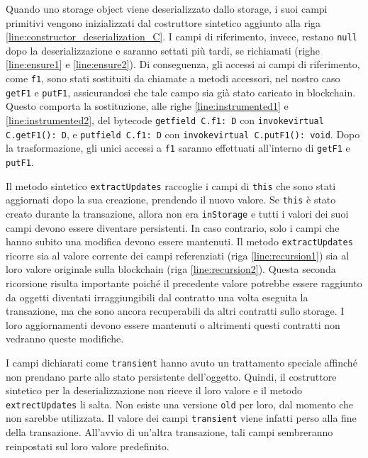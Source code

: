 %
Quando uno storage object viene deserializzato dallo storage, i suoi campi primitivi vengono inizializzati dal costruttore sintetico aggiunto alla riga \ref{line:constructor_deserialization_C}. I campi di riferimento, invece, restano \lstinline|null| dopo la deserializzazione e saranno settati più tardi, se richiamati (righe \ref{line:ensure1} e \ref{line:ensure2}). Di conseguenza, gli accessi ai campi di riferimento, come \lstinline|f1|, sono stati sostituiti da chiamate a metodi accessori, nel nostro caso \lstinline|getF1| e \lstinline|putF1|, assicurandosi che tale campo sia già stato caricato in blockchain. Questo comporta la sostituzione, alle righe \ref{line:instrumented1} e \ref{line:instrumented2}, del bytecode \lstinline|getfield C.f1: D| con \lstinline|invokevirtual C.getF1(): D|, e \lstinline|putfield C.f1: D| con \lstinline|invokevirtual C.putF1(): void|. Dopo la trasformazione, gli unici accessi a \lstinline|f1| saranno effettuati all'interno di \lstinline|getF1| e \lstinline|putF1|. 

Il metodo sintetico \lstinline|extractUpdates| raccoglie i campi di \lstinline|this| che sono stati aggiornati dopo la sua creazione, prendendo il nuovo valore. Se \lstinline|this| è stato creato durante la transazione, allora non era \lstinline|inStorage| e tutti i valori dei suoi campi devono essere diventare persistenti. In caso contrario, solo i campi che hanno subito una modifica devono essere mantenuti. Il metodo \lstinline|extractUpdates| ricorre sia al valore corrente dei campi referenziati (riga \ref{line:recursion1}) sia al loro valore originale sulla blockchain (riga \ref{line:recursion2}). Questa seconda ricorsione risulta importante poiché il precedente valore potrebbe essere raggiunto da oggetti diventati irraggiungibili dal contratto una volta eseguita la transazione, ma che sono ancora recuperabili da altri contratti sullo storage. I loro aggiornamenti devono essere mantenuti o altrimenti questi contratti non vedranno queste modifiche.

I campi dichiarati come \lstinline|transient| hanno avuto un trattamento speciale affinché non prendano parte allo stato persistente dell'oggetto. Quindi, il costruttore sintetico per la deserializzazione non riceve il loro valore e il metodo \lstinline|extrectUpdates| li salta. Non esiste una versione \lstinline|old| per loro, dal momento che non sarebbe utilizzata. Il valore dei campi \lstinline|transient| viene infatti perso alla fine della transazione. All'avvio di un'altra transazione, tali campi sembreranno reinpostati sul loro valore predefinito.

